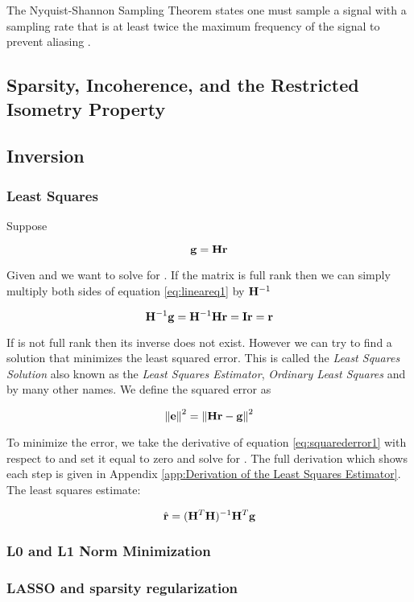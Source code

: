 The Nyquist-Shannon Sampling Theorem states one must sample a signal with a sampling rate that is at least twice the maximum frequency of the signal to prevent aliasing \cite{shannon1949communication}.


\subsection{Sparsity, Incoherence, and the Restricted Isometry Property}

\subsection{Inversion}

\subsubsection{Least Squares}

Suppose 

\begin{equation}\label{eq:lineareq1}
	\mathbf{g} = \mathbf{Hr} 
\end{equation}

Given  and  we want to solve for . If the matrix is full rank then we can simply multiply both sides of equation \ref{eq:lineareq1} by $\mathbf{H}^{-1}$ 

\begin{equation}
	\mathbf{H}^{-1} \mathbf{g} = \mathbf{H}^{-1} \mathbf{Hr} = \mathbf{I} \mathbf{r} = \mathbf{r}
\end{equation}

If  is not full rank then its inverse does not exist. However we can try to find a solution  that minimizes the least squared error. This is called the \emph{Least Squares Solution} also known as the \emph{Least Squares Estimator}, \emph{Ordinary Least Squares} and by many other names. We define the squared error as

\begin{equation}\label{eq:squarederror1}
	\mathbf{ \lVert \mathbf{e} \rVert }^2 =    \mathbf{ \lVert \mathbf{Hr-g} \rVert }^2
\end{equation}

\noindent To minimize the error, we take the derivative of equation \ref{eq:squarederror1} with respect to  and set it equal to zero and solve for . The full derivation which shows each step is given in Appendix \ref{app:Derivation of the Least Squares Estimator}. The least squares estimate:

\begin{equation}
	\hat{ \mathbf{r} } = ( \mathbf{H}^T \mathbf{H} )^{-1} \mathbf{H}^T \mathbf{g}
\end{equation}

\subsubsection{L0 and L1 Norm Minimization}

\subsubsection{LASSO and sparsity regularization}

%  
%



